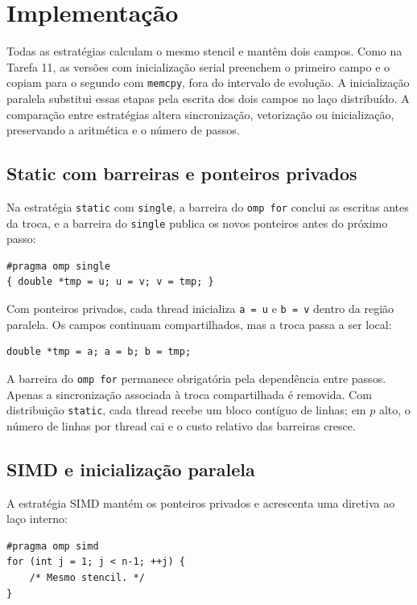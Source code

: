 \documentclass[11pt,letterpaper]{article}
\begin{document}
\section{Implementação}
Todas as estratégias calculam o mesmo stencil e mantêm dois campos. Como na Tarefa 11, as versões com inicialização serial preenchem o primeiro campo e o copiam para o segundo com \texttt{memcpy}, fora do intervalo de evolução. A inicialização paralela substitui essas etapas pela escrita dos dois campos no laço distribuído. A comparação entre estratégias altera sincronização, vetorização ou inicialização, preservando a aritmética e o número de passos.

\subsection{Static com barreiras e ponteiros privados}
Na estratégia \texttt{static} com \texttt{single}, a barreira do \texttt{omp for} conclui as escritas antes da troca, e a barreira do \texttt{single} publica os novos ponteiros antes do próximo passo:
\begin{lstlisting}[caption={Troca dos ponteiros compartilhados após o stencil.}]
#pragma omp single
{ double *tmp = u; u = v; v = tmp; }
\end{lstlisting}

Com ponteiros privados, cada thread inicializa \texttt{a = u} e \texttt{b = v} dentro da região paralela. Os campos continuam compartilhados, mas a troca passa a ser local:
\begin{lstlisting}[caption={Troca local após a barreira do laço espacial.}]
double *tmp = a; a = b; b = tmp;
\end{lstlisting}
A barreira do \texttt{omp for} permanece obrigatória pela dependência entre passos. Apenas a sincronização associada à troca compartilhada é removida. Com distribuição \texttt{static}, cada thread recebe um bloco contíguo de linhas; em $p$ alto, o número de linhas por thread cai e o custo relativo das barreiras cresce.

\subsection{SIMD e inicialização paralela}
A estratégia SIMD mantém os ponteiros privados e acrescenta uma diretiva ao laço interno:
\begin{lstlisting}[caption={Vetorização explícita do laço de células.}]
#pragma omp simd
for (int j = 1; j < n-1; ++j) {
    /* Mesmo stencil. */
}
\end{lstlisting}
\end{document}
